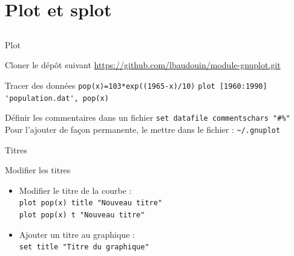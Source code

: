 \documentclass{beamer}
\begin{document}
\section{Plot et splot}
\subsection{}
\begin{frame}[fragile]{Plot}

\begin{block}{Cloner le dép\^ot suivant}
\url{https://github.com/lbaudouin/module-gnuplot.git}
\end{block}

\begin{block}{Tracer des données}
\verb?pop(x)=103*exp((1965-x)/10)?\linebreak
\verb?plot [1960:1990] 'population.dat', pop(x)?
\end{block}

\begin{block}{Définir les commentaires dans un fichier}
\verb?set datafile commentschars "#%"?\linebreak
Pour l'ajouter de façon permanente, le mettre dans le fichier : \verb?~/.gnuplot?
\end{block}
\end{frame}

\begin{frame}{Titres}

\begin{block}{Modifier les titres}
\begin{itemize}
\item Modifier le titre de la courbe :\\
\verb?plot pop(x) title "Nouveau titre"?\\
\verb?plot pop(x) t "Nouveau titre"?
\item Ajouter un titre au graphique :\\ \verb?set title "Titre du graphique"?
\end{itemize}
\end{block}
\end{frame}
\end{document}
